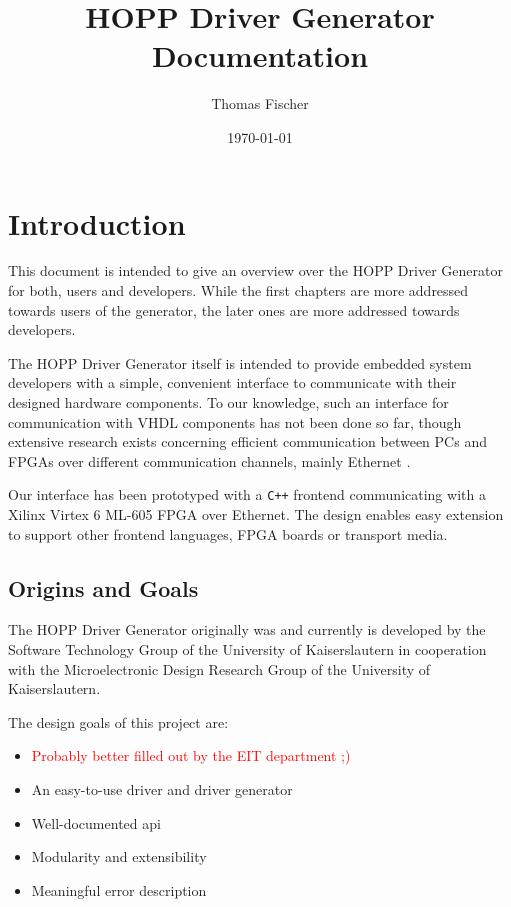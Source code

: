 \documentclass{report}
\begin{document}
\title{HOPP Driver Generator Documentation}
\author{Thomas Fischer}
\date{\today}

\maketitle
\thispagestyle{empty}
\newpage

\tableofcontents
\thispagestyle{empty}
\newpage



\chapter{Introduction}
\label{sec:intro}
This document is intended to give an overview over the HOPP Driver Generator for both, users and developers. While the first chapters are more addressed towards users of the generator, the later ones are more addressed towards developers. 

The HOPP Driver Generator itself is intended to provide embedded system developers %
with a simple, convenient interface to communicate with their designed hardware components. %
To our knowledge, such an interface for communication with VHDL components has not been done so far, though extensive research exists concerning efficient communication between PCs and FPGAs over different communication channels, mainly Ethernet \cite{lofgren05, alachiotis10, alachiotis12}.

Our interface has been prototyped with a \texttt{C++} frontend communicating with a Xilinx Virtex 6 ML-605 FPGA over Ethernet. The design enables easy extension to support other frontend languages, FPGA boards or transport media.

\section{Origins and Goals}
\label{sec:goals}
The HOPP Driver Generator originally was and currently is developed by the Software Technology Group of the University of Kaiserslautern in cooperation with the Microelectronic Design Research Group of the University of Kaiserslautern.

The design goals of this project are:

\begin{itemize}
\item \textcolor{red}{Probably better filled out by the EIT department ;)}
\item An easy-to-use driver and driver generator
\item Well-documented api
\item Modularity and extensibility
\item Meaningful error description
\end{itemize}
\end{document}
